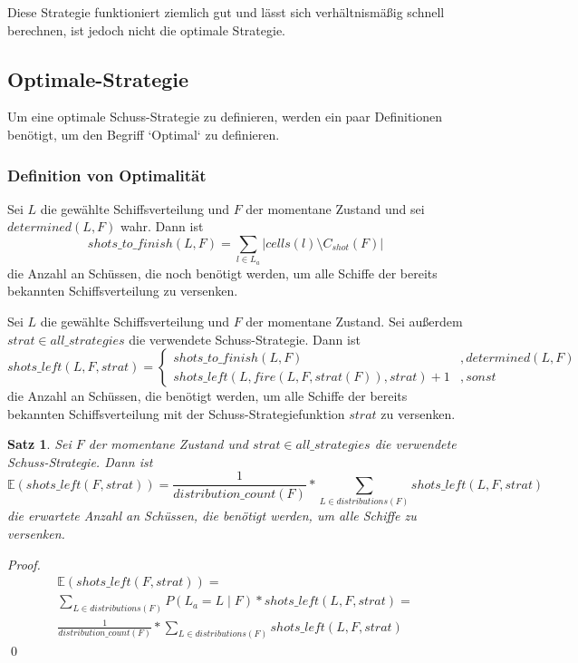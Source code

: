 \documentclass[a4paper,12pt]{llncs}
\numberwithin{equation}{section}
\newtheorem{satz}{Satz}
\begin{document}
Diese Strategie funktioniert ziemlich gut und lässt sich verhältnismäßig schnell berechnen, ist jedoch nicht die optimale Strategie.


\subsection{Optimale-Strategie}

Um eine optimale Schuss-Strategie zu definieren, werden ein paar Definitionen benötigt, um den Begriff `Optimal` zu definieren.

\subsubsection{Definition von Optimalität}

\begin{definition}
Sei $L$ die gewählte Schiffsverteilung und $F$ der momentane Zustand und sei $determined(L, F)$ wahr.
Dann ist
\[
shots\_to\_finish(L, F)=\sum_{l \in L_a}{|cells(l) \setminus C_{shot}(F)|}
\]
die Anzahl an Schüssen, die noch benötigt werden, um alle Schiffe der bereits bekannten Schiffsverteilung zu versenken.
\end{definition}

\begin{definition}
Sei $L$ die gewählte Schiffsverteilung und $F$ der momentane Zustand.
Sei außerdem $strat \in all\_strategies$ die verwendete Schuss-Strategie.
Dann ist
\[
shots\_left(L, F, strat)=
  \begin{cases} 
  	shots\_to\_finish(L, F) & ,determined(L, F) \\
      shots\_left(L, fire(L, F, strat(F)), strat) + 1 & ,sonst
   \end{cases}
\]
die Anzahl an Schüssen, die benötigt werden, um alle Schiffe der bereits bekannten Schiffsverteilung mit der Schuss-Strategiefunktion $strat$ zu versenken.
\end{definition}

\begin{satz}
Sei $F$ der momentane Zustand und $strat \in all\_strategies$ die verwendete Schuss-Strategie.
Dann ist
\[
\mathds{E}(shots\_left(F, strat))=\frac{1}{distribution\_count(F)} * \sum_{L \in distributions(F)}{shots\_left(L, F, strat)}
\]
die erwartete Anzahl an Schüssen, die benötigt werden, um alle Schiffe zu versenken.
\end{satz}

\begin{proof}
\begin{align}
\mathds{E}(shots\_left(F, strat))=\\
\sum_{L \in distributions(F)}{P(L_a= L \mid F) * shots\_left(L, F, strat)} =\\
\frac{1}{distribution\_count(F)} * \sum_{L \in distributions(F)}{shots\_left(L, F, strat)}
\end{align}
\qed
\end{proof}
\end{document}
